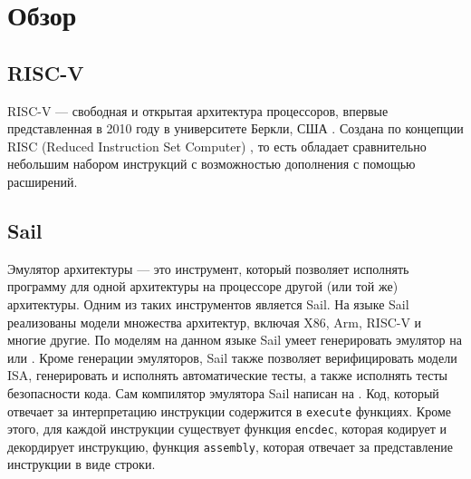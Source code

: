
\section{Обзор}
\label{sec:relatedworks}

\subsection{RISC-V}
RISC-V --- свободная и открытая архитектура процессоров, впервые представленная в 2010 году в университете Беркли, США \cite{waterman2016design}.
Создана по концепции RISC (Reduced Instruction Set Computer) \cite{jamil1995risc}, то есть обладает сравнительно небольшим набором инструкций с возможностью дополнения с помощью расширений.

\subsection{Sail}
Эмулятор архитектуры --- это инструмент, который позволяет исполнять программу для одной архитектуры на процессоре другой (или той же) архитектуры.
Одним из таких инструментов является Sail.
На языке Sail реализованы модели множества архитектур, включая X86, Arm, RISC-V и многие другие.
По моделям на данном языке Sail умеет генерировать эмулятор на \OCaml{} или \C{}.
Кроме генерации эмуляторов, Sail также позволяет верифицировать модели ISA, генерировать и исполнять автоматические тесты, а также исполнять тесты безопасности кода.
Сам компилятор эмулятора Sail написан на \OCaml{}.
Код, который отвечает за интерпретацию инструкции содержится в \texttt{execute} функциях.
Кроме этого, для каждой инструкции существует функция \texttt{encdec}, которая кодирует и декордирует инструкцию, функция \texttt{assembly}, которая отвечает за представление инструкции в виде строки.

